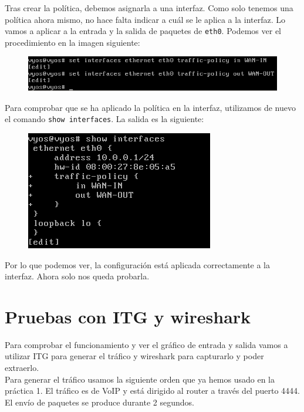 \documentclass[11pt,a4paper]{article}
\begin{document}
Tras crear la política, debemos asignarla a una interfaz. Como solo tenemos una política ahora mismo, no hace falta indicar a cuál se le aplica a la interfaz. Lo vamos a aplicar a la entrada y la salida de paquetes de \texttt{eth0}. Podemos ver el procedimiento en la imagen siguiente:

\begin{figure}[H]
	\centering
	\includegraphics[scale=0.5]{img/shaping-en-interface.png}
\end{figure}

Para comprobar que se ha aplicado la política en la interfaz, utilizamos de nuevo el comando \texttt{show interfaces}. La salida es la siguiente:

\begin{figure}[H]
	\centering
	\includegraphics[scale=0.5]{img/config-con-shape.png}
\end{figure}

Por lo que podemos ver, la configuración está aplicada correctamente a la interfaz. Ahora solo nos queda probarla.

\newpage

\section{Pruebas con ITG y wireshark}

Para comprobar el funcionamiento y ver el gráfico de entrada y salida vamos a utilizar ITG para generar el tráfico y wireshark para capturarlo y poder extraerlo.\\

Para generar el tráfico usamos la siguiente orden que ya hemos usado en la práctica 1. El tráfico es de VoIP y está dirigido al router a través del puerto 4444. El envío de paquetes se produce durante 2 segundos.
\end{document}
